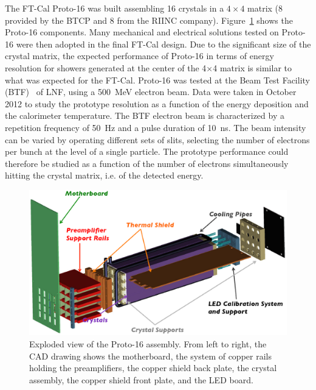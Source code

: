 The FT-Cal Proto-16 was built assembling 16 crystals in a $4\times4$ matrix (8 provided by the BTCP and 8 from
the RIINC company). Figure~\ref{fig:p16-whole} shows the Proto-16 components. Many mechanical and electrical
solutions tested on Proto-16 were then adopted in the final FT-Cal design. Due to the significant size of the crystal
matrix, the expected performance of Proto-16 in terms of energy resolution for showers generated at the center
of the 4$\times$4 matrix is similar to what was expected for the FT-Cal. Proto-16 was tested at the Beam
Test Facility (BTF)~\cite{btf} of LNF, using a 500~MeV electron beam. Data were taken in October 2012 to study
the prototype resolution as a function of the energy deposition and the calorimeter temperature. The BTF electron
beam is characterized by a repetition frequency of 50~Hz and a pulse duration of 10~ns. The beam intensity can be
varied by operating different sets of slits, selecting the number of electrons per bunch at the level of a single
particle. The prototype performance could therefore be studied as a function of the number of electrons 
simultaneously hitting the crystal matrix, i.e. of the detected energy.

\begin{figure}
\includegraphics[width=1.0\columnwidth]{./fig/p16-whole.eps}
\caption{Exploded view of the Proto-16 assembly. From left to right, the CAD drawing shows the motherboard, the
  system of copper rails holding the preamplifiers, the copper shield back plate, the crystal assembly, the copper
  shield front plate, and the LED board.}
\label{fig:p16-whole}
\end{figure}

